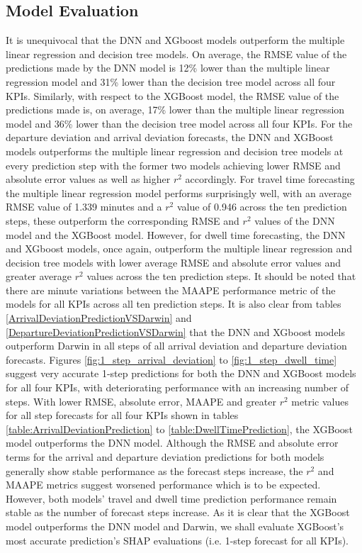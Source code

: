 \documentclass[]{interact}
\theoremstyle{plain}%
\theoremstyle{definition}
\theoremstyle{remark}
\begin{document}
\subsection{Model Evaluation}
It is unequivocal that the DNN and XGboost models outperform the multiple linear regression and decision tree models. On average, the RMSE value of the predictions made by the DNN model is 12\% lower than the multiple linear regression model and 31\% lower than the decision tree model across all four KPIs. Similarly, with respect to the XGBoost model, the RMSE value of the predictions made is, on average, 17\% lower than the multiple linear regression model and 36\% lower than the decision tree model across all four KPIs. For the departure deviation and arrival deviation forecasts, the DNN and XGBoost models outperforms the multiple linear regression and decision tree models at every prediction step with the former two models achieving lower RMSE and absolute error values as well as higher $r^2$ accordingly. For travel time forecasting the multiple linear regression model performs surprisingly well, with an average RMSE value of 1.339 minutes and a $r^2$ value of 0.946 across the ten prediction steps, these outperform the corresponding RMSE and $r^2$  values of the DNN model and the XGBoost model. However, for dwell time forecasting, the DNN and XGboost models, once again, outperform the multiple linear regression and decision tree models with lower average RMSE and absolute error values and greater average $r^2$ values across the ten prediction steps. It should be noted that there are minute variations between the MAAPE performance metric of the models for all KPIs across all ten prediction steps. It is also clear from tables \ref{ArrivalDeviationPredictionVSDarwin} and \ref{DepartureDeviationPredictionVSDarwin} that the DNN and XGboost models outperform Darwin in all steps of all arrival deviation and departure deviation forecasts. Figures \ref{fig:1_step_arrival_deviation} to \ref{fig:1_step_dwell_time} suggest very accurate 1-step predictions for both the DNN and XGBoost models for all four KPIs, with deteriorating performance with an increasing number of steps. With lower RMSE, absolute error, MAAPE and greater $r^2$ metric values for all step forecasts for all four KPIs shown in tables \ref{table:ArrivalDeviationPrediction} to \ref{table:DwellTimePrediction}, the XGBoost model outperforms the DNN model. Although the RMSE and absolute error terms for the arrival and departure deviation predictions for both models generally show stable performance as the forecast steps increase, the $r^2$ and MAAPE metrics suggest worsened performance which is to be expected. However, both models' travel and dwell time prediction performance remain stable as the number of forecast steps increase. As it is clear that the XGBoost model outperforms the DNN model and Darwin, we shall evaluate XGBoost's most accurate prediction's SHAP evaluations (i.e. 1-step forecast for all KPIs).    
 
\end{document}
